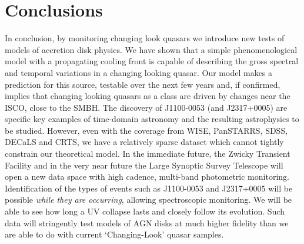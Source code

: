 \documentclass{nature}
\begin{document}
\section{Conclusions} 
In conclusion, by monitoring changing look quasars we introduce new
tests of models of accretion disk physics. We have shown that a simple
phenomenological model with a propagating cooling front is capable of
describing the gross spectral and temporal variations in a changing
looking quasar. Our model makes a prediction for this source, testable
over the next few years and, if confirmed, implies that changing
looking quasars as a class are driven by changes near the ISCO, close
to the SMBH. The discovery of J1100-0053 (and J2317+0005) are specific
key examples of time-domain astronomy and the resulting astrophysics
to be studied. However, even with the coverage from WISE, PanSTARRS,
SDSS, DECaLS and CRTS, we have a relatively sparse dataset which
cannot tightly constrain our theoretical model. In the immediate
future, the Zwicky Transient Facility \citep{Bellm2014} and in the
very near future the Large Synoptic Survey Telescope
\citep{Ivezic2008, LSST_ScienceBookV2} will open a new data space with
high cadence, multi-band photometric monitoring.  Identification of
the types of events such as J1100-0053 and J2317+0005 will be possible
\emph{while they are occurring}, allowing spectroscopic monitoring. We
will be able to see how long a UV collapse lasts and closely follow
its evolution.  Such data will stringently test models of AGN disks at
much higher fidelity than we are able to do with current
`Changing-Look' quasar samples.



\end{document}
